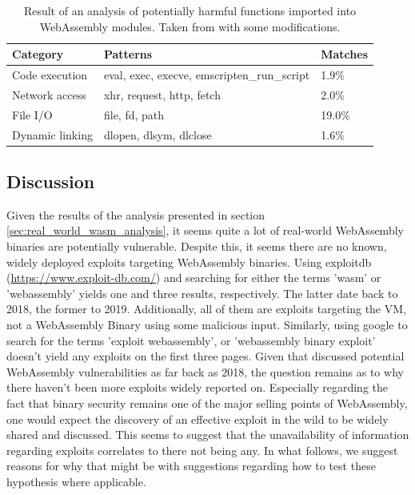 \documentclass[sigconf]{acmart}
\begin{document}
{\begin{table}
\label{table:analysis_import_harmful_functions}
\caption{Result of an analysis of potentially harmful functions imported into WebAssembly modules. Taken from \cite{hilbig_empirical_2021} with some modifications.}
\begin{tabular}{l|l|l}
  \toprule
  Category & Patterns & Matches\\
  \midrule
  Code execution & eval, exec, execve, emscripten\_run\_script & 1.9\% \\ \hline
  Network access & xhr, request, http, fetch & 2.0\% \\ \hline
  File I/O  & file, fd, path & 19.0\% \\ \hline
  Dynamic linking & dlopen, dlsym, dlclose  & 1.6\%
\end{tabular}
\end{table}

\subsection{Discussion}
\label{sec:discussion}
Given the results of the analysis presented in section \ref{sec:real_world_wasm_analysis}, it seems quite a lot of real-world WebAssembly binaries are potentially vulnerable. Despite this, it seems there are no known, widely deployed exploits targeting WebAssembly binaries. Using exploitdb (\url{https://www.exploit-db.com/}) and searching for either the terms 'wasm' or 'webassembly' yields one and three results, respectively. The latter date back to 2018, the former to 2019. Additionally, all of them are exploits targeting the VM, not a WebAssembly Binary using some malicious input. Similarly, using google to search for the terms 'exploit webassembly', or 'webassembly binary exploit' doesn't yield any exploits on the first three pages. Given that \cite{mcfadden_security_2018} discussed potential WebAssembly vulnerabilities as far back as 2018, the question remains as to why there haven't been more exploits widely reported on. Especially regarding the fact that binary security remains one of the major selling points of WebAssembly, one would expect the discovery of an effective exploit in the wild to be widely shared and discussed. This seems to suggest that the unavailability of information regarding exploits correlates to there not being any. In what follows, we suggest reasons for why that might be with suggestions regarding how to test these hypothesis where applicable.

}
\end{document}
